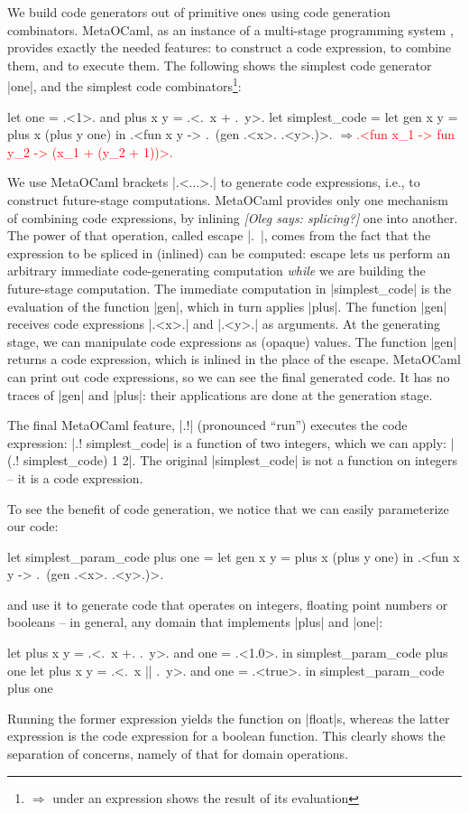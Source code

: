 \documentclass[draft]{elsart}
\newcommand{\evalresult}[1]{\ensuremath{\Longrightarrow}\textcolor{red}{#1}}
\newcommand{\oleg}[1]{{\it [Oleg says: #1]}}
\begin{document}
We build code generators out of primitive ones using code generation 
combinators. MetaOCaml, as an instance of a multi-stage
programming system \cite{TahaThesis}, provides exactly the needed
features: to construct a code expression, to combine them, and to
execute them. The following shows the simplest code generator |one|,
and the simplest code combinators\footnote{%
$\Longrightarrow$ under an expression shows the result of its evaluation}:

\begin{code}
let one = .<1>. and plus x y = .<.~x + .~y>.
let simplest_code = let gen x y = plus x (plus y one) in
  .<fun x y -> .~(gen .<x>. .<y>.)>.
\evalresult{.<fun x_1 -> fun y_2 -> (x_1 + (y_2 + 1))>.}
\end{code}

We use MetaOCaml brackets |.<...>.| to generate code expressions,
i.e., to construct future-stage computations. MetaOCaml provides only
one mechanism of combining code expressions, by inlining
\oleg{splicing?} one into
another. The power of that operation, called escape |.~|, comes from
the fact that the expression to be spliced in (inlined) can be
computed: escape lets us perform an arbitrary immediate code-generating
computation \emph{while} we are
building the future-stage computation. The immediate computation in
|simplest_code| is the evaluation of the function |gen|, which in turn
applies |plus|. The function |gen| receives code expressions |.<x>.|
and |.<y>.| as arguments. At the generating stage, we can manipulate
code expressions as (opaque) values. The function |gen| returns a code
expression, which is inlined in the place of the escape. MetaOCaml can
print out code expressions, so we can see the final generated code. It
has no traces of |gen| and |plus|: their applications are done at the
generation stage.

The final MetaOCaml feature, |.!| (pronounced ``run'') 
executes the code expression: |.! simplest_code| is a function of two
integers, which we can apply: |(.! simplest_code) 1 2|. The original
|simplest_code| is not a function on integers -- it is a code
expression.

To see the benefit of code generation, we notice that we can easily
parameterize our code:

\begin{code}
let simplest_param_code plus one =
  let gen x y = plus x (plus y one) in
  .<fun x y -> .~(gen .<x>. .<y>.)>.
\end{code}
and use it to generate code that operates on integers, floating point
numbers or booleans -- in general, any domain that implements |plus|
and |one|:
\begin{code}
let plus x y = .<.~x +. .~y>. and one = .<1.0>. in
  simplest_param_code plus one
let plus x y = .<.~x || .~y>. and one = .<true>. in
  simplest_param_code plus one
\end{code}
Running the former expression yields the function on |float|s, whereas
the latter expression is the code expression for a boolean function.
This clearly shows the separation of concerns, namely of that for domain
operations.
\end{document}
